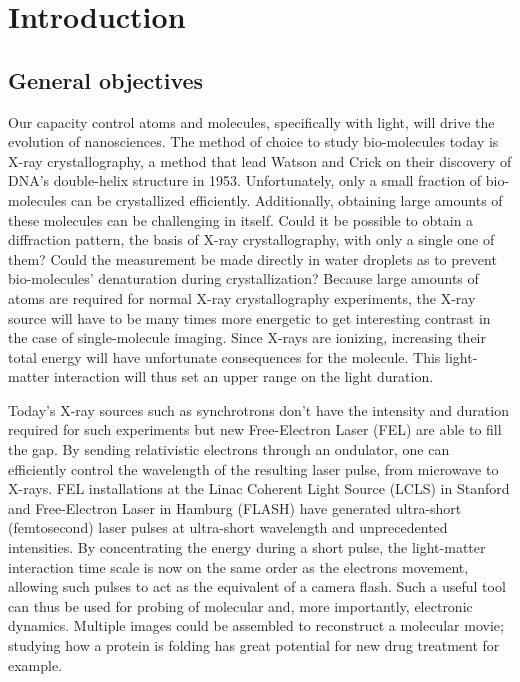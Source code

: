 \section{Introduction}


\subsection{General objectives}


Our capacity control atoms and molecules, specifically with light,
will drive the evolution of nanosciences. The method of choice to study 
bio-molecules today is X-ray crystallography, a method that lead Watson and 
Crick on their discovery of DNA's double-helix structure in 1953. 
Unfortunately, only a small fraction of bio-molecules can be crystallized 
efficiently. Additionally, obtaining large amounts of these molecules can be 
challenging in itself. Could it be possible to obtain a diffraction pattern, 
the basis of X-ray crystallography, with only a single one of them? Could the 
measurement be made directly in water droplets as to prevent bio-molecules' 
denaturation during crystallization? Because large amounts of atoms are 
required for normal X-ray crystallography experiments, the X-ray source will 
have to be many times more energetic to get interesting contrast in the 
case of single-molecule imaging. Since X-rays are ionizing, increasing their 
total energy will have unfortunate consequences for the molecule. This 
light-matter interaction will thus set an upper range on the light duration.

Today's X-ray sources such as synchrotrons don't have the intensity and 
duration required for such experiments but new Free-Electron Laser (FEL) are 
able to fill the gap. By sending relativistic electrons through an ondulator, 
one can efficiently control the wavelength of the resulting laser pulse, from 
microwave to X-rays. FEL installations at the Linac Coherent Light Source 
(LCLS) in Stanford and Free-Electron Laser in Hamburg (FLASH) have generated 
ultra-short (femtosecond) laser pulses at ultra-short wavelength and 
unprecedented intensities. By concentrating the energy during a short pulse, 
the light-matter interaction time scale is now on the same order as the 
electrons movement, allowing such pulses to act as the equivalent of a camera 
flash. Such a useful tool can thus be used for probing of molecular 
and, more importantly, electronic dynamics. Multiple images could be assembled 
to reconstruct a molecular movie; studying how a protein is folding has great 
potential for new drug treatment for example.

